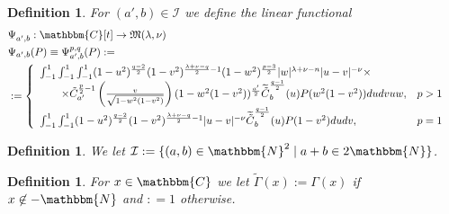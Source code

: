\documentclass{article}
\newcommand{\assign}{:=}
\newcommand{\nin}{\not\in}
\newtheorem{definition}[proposition]{Definition}
\theoremstyle{remark}
\begin{document}
\begin{definition}
  \label{sphermult:def-Phi}For $(a', b) \in \mathcal{I}$ we define the linear
  functional
  \begin{eqnarray}
    & \Psi_{a', b}^{} : \mathbbm{C} [t] \rightarrow \mathfrak{M} (\lambda,
    \nu) &  \nonumber\\
    & \Psi_{a', b} (P) \equiv \Psi_{a', b}^{p, q} (P) \assign &  \nonumber\\
    & \assign \left\{ \begin{array}{ll}
      \int_{- 1}^1 \int_{- 1}^1 \int_{- 1}^1 (1 - u^2)^{\frac{q - 2}{2}} (1 -
      v^2)^{\frac{\lambda + \nu - q}{2} - 1} (1 - w^2)^{\frac{p - 3}{2}} | w
      |^{\lambda + \nu - n} | u - v |^{- \nu} \times & \\
      \qquad \times \tilde{C}^{\frac{p}{2} - 1}_{a'} \left( \frac{v}{\sqrt{1 -
      w^2 (1 - v^2)}} \right) (1 - w^2 (1 - v^2))^{\frac{a'}{2}}
      \widetilde{\tilde{C}}^{\frac{q - 1}{2}}_b (u) P (w^2 (1 - v^2)) d u d v
      u w, & p > 1\\
      \int_{- 1}^1 \int_{- 1}^1 (1 - u^2)^{\frac{q - 2}{2}} (1 -
      v^2)^{\frac{\lambda + \nu - q}{2} - 1} | u - v |^{- \nu}
      \widetilde{\tilde{C}}^{\frac{q - 1}{2}}_b (u) P (1 - v^2) d u d v, & p =
      1
    \end{array} \right. &  \nonumber
  \end{eqnarray}
\end{definition}

\begin{definition}
  \label{sphermult:def-I}We let $\mathcal{I} \assign \{ (a, b) \in
  \mathbbm{N}^2 \mid a + b \in 2\mathbbm{N} \}$.
\end{definition}

\begin{definition}
  \label{intform:def-Gtilde}For $x \in \mathbbm{C}$ we let $\tilde{\Gamma} (x)
  \assign \Gamma (x)$ if $x \nin -\mathbbm{N}$ and $: = 1$ otherwise.
\end{definition}
\end{document}
